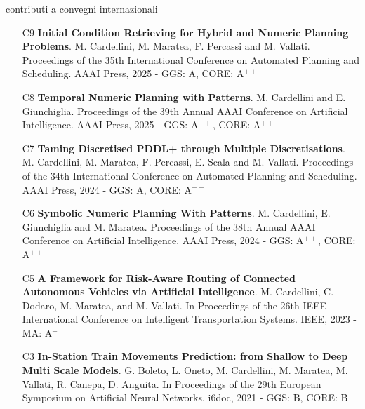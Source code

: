 \documentclass{resume} %
\begin{document}
\begin{rSection}{contributi a convegni internazionali}
\begin{enumerate}[leftmargin=5mm]
	\item[C9] \textbf{Initial Condition Retrieving for Hybrid and Numeric Planning Problems}. M. Cardellini, M. Maratea, F. Percassi and M. Vallati. Proceedings of the 35th International Conference on Automated Planning and Scheduling. AAAI Press, 2025 - GGS: A, CORE: A$^{++}$
	
	
	\item[C8] \textbf{Temporal Numeric Planning with Patterns}. M. Cardellini and E. Giunchiglia. Proceedings of the 39th Annual AAAI Conference on Artificial Intelligence. AAAI Press, 2025 - GGS: A$^{++}$, CORE: A$^{++}$
	
	\item[C7] \textbf{Taming Discretised PDDL+ through Multiple Discretisations}. M. Cardellini, M. Maratea, F. Percassi, E. Scala and M. Vallati. Proceedings of the 34th International Conference on Automated Planning and Scheduling. AAAI Press, 2024 - GGS: A, CORE: A$^{++}$
	
	\item[C6] \textbf{Symbolic Numeric Planning With Patterns}. M. Cardellini, E. Giunchiglia and M. Maratea. Proceedings of the 38th Annual AAAI Conference on Artificial Intelligence. AAAI Press, 2024 - GGS: A$^{++}$, CORE: A$^{++}$
	
	\item[C5] \textbf{A Framework for Risk-Aware Routing of Connected Autonomous Vehicles via Artificial Intelligence}. M. Cardellini, C. Dodaro, M. Maratea, and M. Vallati. In Proceedings of the 26th IEEE International Conference on Intelligent Transportation Systems. IEEE, 2023 - MA: A$^-$
	
	
	
	\item[C3] \textbf{In-Station Train Movements Prediction: from Shallow to Deep Multi Scale Models}. G. Boleto, L. Oneto, M. Cardellini, M. Maratea, M. Vallati, R. Canepa, D. Anguita. In Proceedings of the 29th European Symposium on Artificial Neural Networks. i6doc, 2021 - GGS: B, CORE: B
	

\end{enumerate}
\end{rSection}
\end{document}
